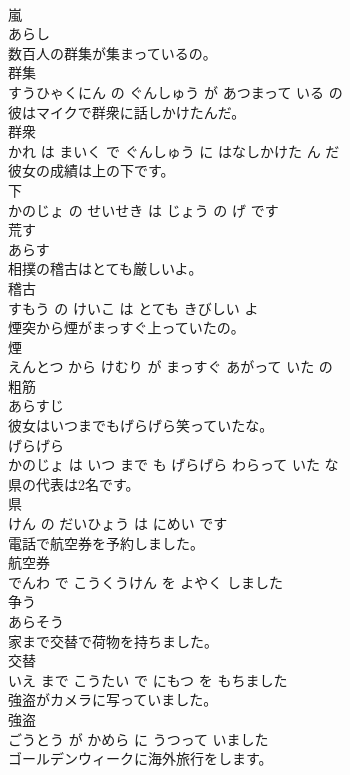 \documentclass[8pt]{extreport}
\begin{document}
\begin{CJK}{UTF8}{min}
\\	嵐	
\\	あらし		
\\	数百人の群集が集まっているの。	
\\	群集 
\\	すうひゃくにん の ぐんしゅう が あつまって いる の			
\\	彼はマイクで群衆に話しかけたんだ。	
\\	群衆 
\\	かれ は まいく で ぐんしゅう に はなしかけた ん だ			
\\	彼女の成績は上の下です。	
\\	下 
\\	かのじょ の せいせき は じょう の げ です			
\\	荒す	
\\	あらす		
\\	相撲の稽古はとても厳しいよ。	
\\	稽古 
\\	すもう の けいこ は とても きびしい よ			
\\	煙突から煙がまっすぐ上っていたの。	
\\	煙 
\\	えんとつ から けむり が まっすぐ あがって いた の			
\\	粗筋	
\\	あらすじ		
\\	彼女はいつまでもげらげら笑っていたな。	
\\	げらげら 
\\	かのじょ は いつ まで も げらげら わらって いた な			
\\	県の代表は2名です。	
\\	県 
\\	けん の だいひょう は にめい です			
\\	電話で航空券を予約しました。	
\\	航空券 
\\	でんわ で こうくうけん を よやく しました			
\\	争う	
\\	あらそう		
\\	家まで交替で荷物を持ちました。	
\\	交替 
\\	いえ まで こうたい で にもつ を もちました			
\\	強盗がカメラに写っていました。	
\\	強盗 
\\	ごうとう が かめら に うつって いました			
\\	ゴールデンウィークに海外旅行をします。	

\end{CJK}
\end{document}
